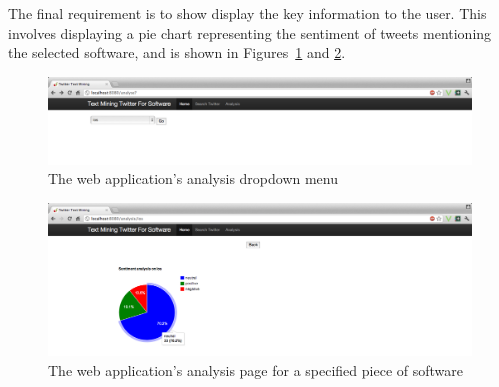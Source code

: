 The final requirement is to show display the key information to the user. This involves displaying a pie chart representing the sentiment of tweets mentioning the selected software, and is shown in Figures~\ref{fig:gui4} and \ref{fig:gui5}.

\begin{figure}[h]
\begin{center}
\includegraphics[width=15cm]{gui4}
\end{center}
\caption{The web application's analysis dropdown menu}
\label{fig:gui4}
\end{figure}

\begin{figure}[h]
\begin{center}
\includegraphics[width=15cm]{gui5}
\end{center}
\caption{The web application's analysis page for a specified piece of software}
\label{fig:gui5}
\end{figure}
